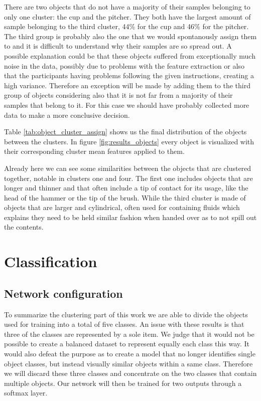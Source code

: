 There are two objects that do not have a majority of their samples belonging to only one cluster: the cup and the pitcher. They both have the largest amount of sample belonging to the third cluster, 44\% for the cup and 46\% for the pitcher. The third group is probably also the one that we would spontanously assign them to and it is difficult to understand why their samples are so spread out. A possible explanation could be that these objects suffered from exceptionally much noise in the data, possibly due to problems with the feature extraction or also that the participants having problems following the given instructions, creating a high variance. Therefore an exception will be made by adding them to the third group of objects considering also that it is not far from a majority of their samples that belong to it. For this case we should have probably collected more data to make a more conclusive decision.

Table \ref{tab:object_cluster_assign} shows us the final distribution of the objects between the clusters. In figure \ref{fig:results_objects} every object is visualized with their corresponding cluster mean features applied to them.

Already here we can see some similarities between the objects that are clustered together, notable in clusters one and four. The first one includes objects that are longer and thinner and that often include a tip of contact for its usage, like the head of the hammer or the tip of the brush. While the third cluster is made of objects that are larger and cylindrical, often used for containing fluids which explains they need to be held similar fashion when handed over as to not spill out the contents.



%

\section{Classification}

\subsection{Network configuration}
\label{sec:res_setup}

To summarize the clustering part of this work we are able to divide the objects used for training into a total of five classes. An issue with these results is that three of the classes are represented by a sole item. We judge that it would not be possible to create a balanced dataset to represent equally each class this way. It would also defeat the purpose as to create a model that no longer identifies single object classes, but instead visually similar objects within a same class. Therefore we will discard these three classes and concentrate on the two classes that contain multiple objects. Our network will then be trained for two outputs through a softmax layer.

